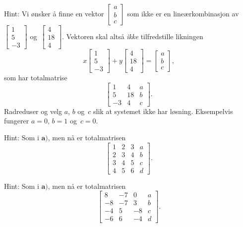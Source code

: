\begin{losning}
	
\begin{punkt}
Hint: Vi ønsker å finne en vektor $\begin{bmatrix}
a\\
b\\
c
\end{bmatrix}$ som ikke er en lineærkombinasjon av 
$
\begin{bmatrix}
	1\\
	5\\
	-3
\end{bmatrix}$ og~$
\begin{bmatrix}
	4\\
	18\\
	4
\end{bmatrix}$. Vektoren skal altså \emph{ikke} tilfredstille likningen 
$$x
\begin{bmatrix}
1\\
5\\
-3
\end{bmatrix}+y
\begin{bmatrix}
4\\
18\\
4
\end{bmatrix}=
\begin{bmatrix}
a\\
b\\
c
\end{bmatrix},$$
som har totalmatrise
$$\begin{bmatrix}
1  & 4  & a\\
5  & 18 & b\\
-3 & 4  & c
\end{bmatrix}.$$ Radreduser og velg $a$, $b$ og~$c$ slik at systemet ikke har løsning. Eksempelvis fungerer $a=0$, $b=1$ og~$c=0$.
\end{punkt}

\begin{punkt}
Hint: Som i $\textbf{a)}$, men nå er totalmatrisen
$$\begin{bmatrix}
1 & 2 & 3 & a\\
2 & 3 & 4 & b\\
3 & 4 & 5 & c\\
4 & 5 & 6 & d
\end{bmatrix}.$$
\end{punkt}


\begin{punkt}
Hint: Som i $\textbf{a)}$, men nå er totalmatrisen
$$\begin{bmatrix}
8  & -7 & 0  & a\\
-8 & -7 & 3  & b\\
-4 & 5  & -8 & c\\
-6 & 6  & -4 & d
\end{bmatrix}.$$
\end{punkt}
\end{losning}


